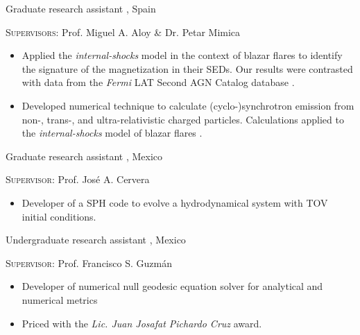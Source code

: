 %
{\DAAval}%
{Graduate research assistant}%
{}%
{\UVval, Spain}%
{\textsc{Supervisors}: Prof. Miguel A. Aloy \& Dr. Petar Mimica
  \begin{itemize}
    \item Applied the \emph{internal-shocks} model in the context of blazar flares to identify the signature of the magnetization in their SEDs. Our results were contrasted with data from the \emph{Fermi} LAT Second AGN Catalog database \cite{RuedaBecerril:2014mi}.
    \item Developed numerical technique to calculate (cyclo-)synchrotron emission from non-, trans-, and ultra-relativistic charged particles. Calculations applied to the \emph{internal-shocks} model of blazar flares \cite{RuedaBecerril:2017mi}.
  \end{itemize}
}
%
{\IFMes}%
{Graduate research assistant}%
{}%
{\UMSNHes, Mexico}%
{\textsc{Supervisor}: Prof. José A. Cervera
  \begin{itemize}
    \item Developer of a SPH code to evolve a hydrodynamical system with TOV initial conditions.
  \end{itemize}
}
%
{\FCes}%
{Undergraduate research assistant}%
{}%
{\UAEMes, Mexico}%
{\textsc{Supervisor}: Prof. Francisco S. Guzmán
  \begin{itemize}
    \item Developer of numerical null geodesic equation solver for analytical and numerical metrics \cite{Guzman:2009ru}
    \item Priced with the \emph{Lic. Juan Josafat Pichardo Cruz} award.
  \end{itemize}
}
